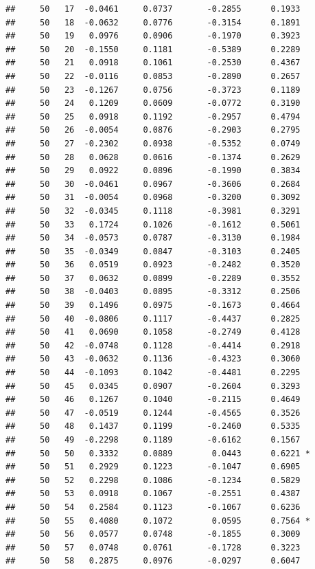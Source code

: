 \documentclass[
]{article}
\begin{document}
\begin{verbatim}
##     50   17  -0.0461     0.0737       -0.2855      0.1933  
##     50   18  -0.0632     0.0776       -0.3154      0.1891  
##     50   19   0.0976     0.0906       -0.1970      0.3923  
##     50   20  -0.1550     0.1181       -0.5389      0.2289  
##     50   21   0.0918     0.1061       -0.2530      0.4367  
##     50   22  -0.0116     0.0853       -0.2890      0.2657  
##     50   23  -0.1267     0.0756       -0.3723      0.1189  
##     50   24   0.1209     0.0609       -0.0772      0.3190  
##     50   25   0.0918     0.1192       -0.2957      0.4794  
##     50   26  -0.0054     0.0876       -0.2903      0.2795  
##     50   27  -0.2302     0.0938       -0.5352      0.0749  
##     50   28   0.0628     0.0616       -0.1374      0.2629  
##     50   29   0.0922     0.0896       -0.1990      0.3834  
##     50   30  -0.0461     0.0967       -0.3606      0.2684  
##     50   31  -0.0054     0.0968       -0.3200      0.3092  
##     50   32  -0.0345     0.1118       -0.3981      0.3291  
##     50   33   0.1724     0.1026       -0.1612      0.5061  
##     50   34  -0.0573     0.0787       -0.3130      0.1984  
##     50   35  -0.0349     0.0847       -0.3103      0.2405  
##     50   36   0.0519     0.0923       -0.2482      0.3520  
##     50   37   0.0632     0.0899       -0.2289      0.3552  
##     50   38  -0.0403     0.0895       -0.3312      0.2506  
##     50   39   0.1496     0.0975       -0.1673      0.4664  
##     50   40  -0.0806     0.1117       -0.4437      0.2825  
##     50   41   0.0690     0.1058       -0.2749      0.4128  
##     50   42  -0.0748     0.1128       -0.4414      0.2918  
##     50   43  -0.0632     0.1136       -0.4323      0.3060  
##     50   44  -0.1093     0.1042       -0.4481      0.2295  
##     50   45   0.0345     0.0907       -0.2604      0.3293  
##     50   46   0.1267     0.1040       -0.2115      0.4649  
##     50   47  -0.0519     0.1244       -0.4565      0.3526  
##     50   48   0.1437     0.1199       -0.2460      0.5335  
##     50   49  -0.2298     0.1189       -0.6162      0.1567  
##     50   50   0.3332     0.0889        0.0443      0.6221 *
##     50   51   0.2929     0.1223       -0.1047      0.6905  
##     50   52   0.2298     0.1086       -0.1234      0.5829  
##     50   53   0.0918     0.1067       -0.2551      0.4387  
##     50   54   0.2584     0.1123       -0.1067      0.6236  
##     50   55   0.4080     0.1072        0.0595      0.7564 *
##     50   56   0.0577     0.0748       -0.1855      0.3009  
##     50   57   0.0748     0.0761       -0.1728      0.3223  
##     50   58   0.2875     0.0976       -0.0297      0.6047  

\end{verbatim}
\end{document}
